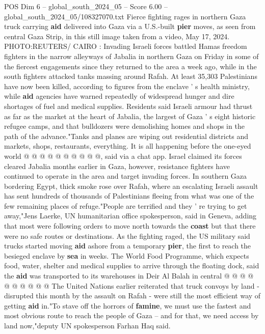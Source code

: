 \begin{textsample}{POS Dim 6 – global\_south\_2024\_05 – Score 6.00 – global\_south\_2024\_05/108327070.txt}  \label{ex:f6_pos_155}
Fierce fighting rages in northern Gaza truck carrying \textbf{aid} delivered into Gaza via a U.S.-built \textbf{pier} moves, as seen from central Gaza Strip, in this still image taken from a video, May 17, 2024.
PHOTO:REUTERS/ CAIRO : Invading Israeli forces battled Hamas freedom fighters in the narrow alleyways of Jabalia in northern Gaza on Friday in some of the fiercest engagements since they returned to the area a week ago, while in the south fighters attacked tanks massing around Rafah.
At least 35,303 Palestinians have now been killed, according to figures from the enclave ' s health ministry, while \textbf{aid} agencies have warned repeatedly of widespread hunger and dire shortages of fuel and medical supplies.
Residents said Israeli armour had thrust as far as the market at the heart of Jabalia, the largest of Gaza ' s eight historic refugee camps, and that bulldozers were demolishing homes and shops in the path of the advance."Tanks and planes are wiping out residential districts and markets, shops, restaurants, everything.
It is all happening before the one-eyed world @ @ @ @ @ @ @ @ @ @, said via a chat app.
Israel claimed its forces cleared Jabalia months earlier in Gaza, however, resistance fighters have continued to operate in the area and target invading forces.
In southern Gaza bordering Egypt, thick smoke rose over Rafah, where an escalating Israeli assault has sent hundreds of thousands of Palestinians fleeing from what was one of the few remaining places of refuge."People are terrified and they ' re trying to get away,"Jens Laerke, UN humanitarian office spokesperson, said in Geneva, adding that most were following orders to move north towards the \textbf{coast} but that there were no safe routes or destinations.
As the fighting raged, the US military said trucks started moving \textbf{aid} ashore from a temporary \textbf{pier}, the first to reach the besieged enclave by \textbf{sea} in weeks.
The World Food Programme, which expects food, water, shelter and medical supplies to arrive through the floating dock, said the \textbf{aid} was transported to its warehouses in Deir Al Balah in central @ @ @ @ @ @ @ @ @ @ The United Nations earlier reiterated that truck convoys by land - disrupted this month by the assault on Rafah - were still the most efficient way of getting \textbf{aid} in."To stave off the horrors of \textbf{famine}, we must use the fastest and most obvious route to reach the people of Gaza -- and for that, we need access by land now,"deputy UN spokesperson Farhan Haq said.

\end{textsample}
